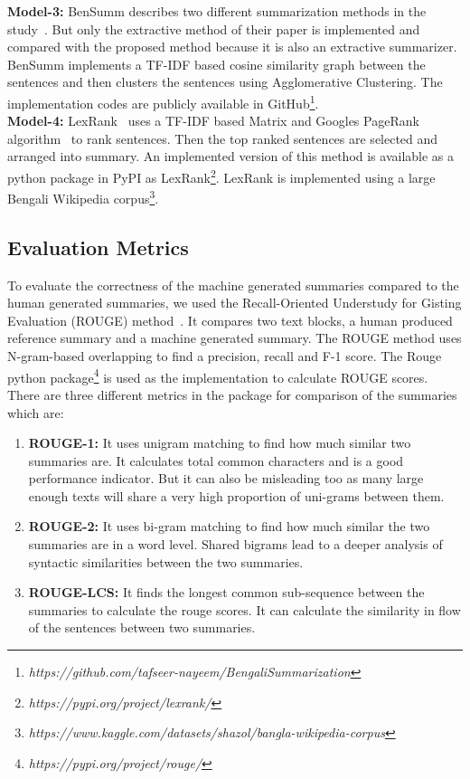\textbf{Model-3:} BenSumm describes two different summarization methods in the study~\cite{chowdhury-etal-2021-tfidf-clustering}. But only the extractive method of their paper is implemented and compared with the proposed method because it is also an extractive summarizer. BenSumm implements a TF-IDF based cosine similarity graph between the sentences and then clusters the sentences using Agglomerative Clustering. The implementation codes are publicly available in GitHub\footnote{\textit{https://github.com/tafseer-nayeem/BengaliSummarization}}.\\

\textbf{Model-4:} LexRank~\cite{Erkan-lexRank-2004} uses a TF-IDF based Matrix and Googles PageRank algorithm~\cite{page-PageRank-1999} to rank sentences. Then the top ranked sentences are selected and arranged into summary. An implemented version of this method is available as a python package in PyPI as LexRank\footnote{\textit{https://pypi.org/project/lexrank/}}. LexRank is implemented using a large Bengali Wikipedia corpus\footnote{\textit{https://www.kaggle.com/datasets/shazol/bangla-wikipedia-corpus}}.

\subsection{Evaluation Metrics}\label{subsec:evaluation-metrics}
To evaluate the correctness of the machine generated summaries compared to the human generated summaries, we used the Recall-Oriented Understudy for Gisting Evaluation (ROUGE) method~\cite{lin-2004-rouge}. It compares two text blocks, a human produced reference summary and a machine generated summary. The ROUGE method uses N-gram-based overlapping to find a precision, recall and F-1 score. The Rouge python package\footnote{\textit{https://pypi.org/project/rouge/}} is used as the implementation to calculate ROUGE scores. There are three different metrics in the package for comparison of the summaries which are:

\begin{enumerate}
    \item \textbf{ROUGE-1:} It uses unigram matching to find how much similar two summaries are. It calculates total common characters and is a good performance indicator. But it can also be misleading too as many large enough texts will share a very high proportion of uni-grams between them.
    \item \textbf{ROUGE-2:} It uses bi-gram matching to find how much similar the two summaries are in a word level. Shared bigrams lead to a deeper analysis of syntactic similarities between the two summaries.
    \item \textbf{ROUGE-LCS:} It finds the longest common sub-sequence between the summaries to calculate the rouge scores. It can calculate the similarity in flow of the sentences between two summaries.
\end{enumerate}

